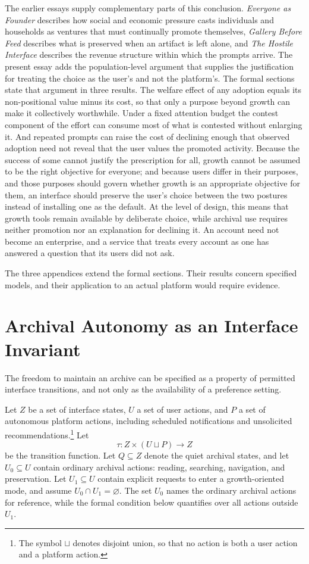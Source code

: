 \documentclass[12pt]{article}
\theoremstyle{plain}
\theoremstyle{definition}
\begin{document}
The earlier essays supply complementary parts of this conclusion. \emph{Everyone as Founder} describes how social and economic pressure casts individuals and households as ventures that must continually promote themselves, \emph{Gallery Before Feed} describes what is preserved when an artifact is left alone, and \emph{The Hostile Interface} describes the revenue structure within which the prompts arrive. The present essay adds the population-level argument that supplies the justification for treating the choice as the user's and not the platform's. The formal sections state that argument in three results. The welfare effect of any adoption equals its non-positional value minus its cost, so that only a purpose beyond growth can make it collectively worthwhile. Under a fixed attention budget the contest component of the effort can consume most of what is contested without enlarging it. And repeated prompts can raise the cost of declining enough that observed adoption need not reveal that the user values the promoted activity. Because the success of some cannot justify the prescription for all, growth cannot be assumed to be the right objective for everyone; and because users differ in their purposes, and those purposes should govern whether growth is an appropriate objective for them, an interface should preserve the user's choice between the two postures instead of installing one as the default. At the level of design, this means that growth tools remain available by deliberate choice, while archival use requires neither promotion nor an explanation for declining it. An account need not become an enterprise, and a service that treats every account as one has answered a question that its users did not ask.

\appendix

The three appendices extend the formal sections. Their results concern specified models, and their application to an actual platform would require evidence.

\section{Archival Autonomy as an Interface Invariant}

The freedom to maintain an archive can be specified as a property of permitted interface transitions, and not only as the availability of a preference setting.

Let $Z$ be a set of interface states, $U$ a set of user actions, and $P$ a set of autonomous platform actions, including scheduled notifications and unsolicited recommendations.\footnote{The symbol $\sqcup$ denotes disjoint union, so that no action is both a user action and a platform action.} Let
\[
\tau:Z\times(U\sqcup P)\longrightarrow Z
\]
be the transition function. Let $Q\subseteq Z$ denote the quiet archival states, and let $U_0\subseteq U$ contain ordinary archival actions: reading, searching, navigation, and preservation. Let $U_1\subseteq U$ contain explicit requests to enter a growth-oriented mode, and assume $U_0\cap U_1=\varnothing$. The set $U_0$ names the ordinary archival actions for reference, while the formal condition below quantifies over all actions outside $U_1$.
\end{document}
